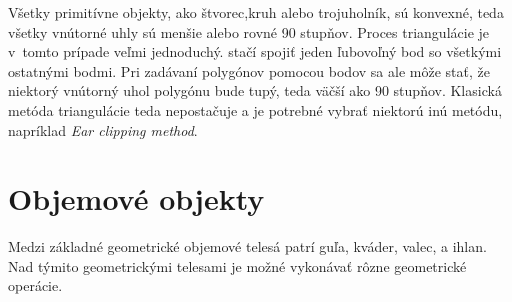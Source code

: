 Všetky primitívne objekty, ako štvorec,kruh alebo trojuholník, sú konvexné, teda všetky vnútorné uhly sú menšie alebo rovné 90 stupňov. Proces triangulácie je v~tomto prípade veľmi jednoduchý. stačí spojiť jeden ľubovoľný bod so všetkými ostatnými bodmi. Pri zadávaní polygónov pomocou bodov sa ale môže stať, že niektorý vnútorný uhol polygónu bude tupý, teda väčší ako 90 stupňov. Klasická metóda triangulácie teda nepostačuje a je potrebné vybrať niektorú inú metódu, napríklad \textit{Ear clipping method}.













































\section{Objemové objekty}
Medzi základné geometrické objemové telesá patrí guľa, kváder, valec, a ihlan. Nad týmito geometrickými telesami je možné vykonávať rôzne geometrické operácie.







